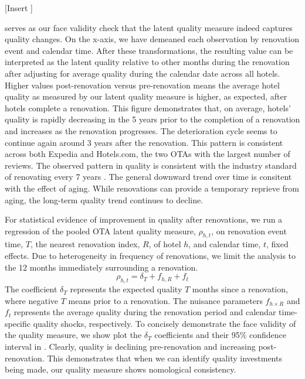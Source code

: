 \documentclass[mksc,blindrev]{informs3} %
\begin{document}
[Insert ]

 serves as our face validity check that the latent quality measure indeed captures quality changes. On the x-axis, we have demeaned each observation by renovation event and calendar time. After these transformations, the resulting value can be interpreted as the latent quality relative to other months during the renovation after adjusting for average quality during the calendar date across all hotels. Higher values post-renovation versus pre-renovation means the average hotel quality as measured by our latent quality measure is higher, as expected, after hotels complete a renovation. This figure demonstrates that, on average, hotels' quality is rapidly decreasing in the 5 years prior to the completion of a renovation and increases as the renovation progresses. The deterioration cycle seems to continue again around 3 years after the renovation. This pattern is consistent across both Expedia and Hotels.com, the two OTAs with the largest number of reviews. The observed pattern in quality is consistent with the industry standard of renovating every 7 years \citep{renofreq2008}. The general downward trend over time is consitent with the effect of aging. While renovations can provide a temporary reprieve from aging, the long-term quality trend continues to decline. 

For statistical evidence of improvement in quality after renovations, we run a regression of the pooled OTA latent quality measure, $\rho_{h,t}$, on renovation event time, $T$, the nearest renovation index, $R$, of hotel $h$, and calendar time, $t$, fixed effects. Due to heterogeneity in frequency of renovations, we limit the analysis to the 12 months immediately surrounding a renovation.
\begin{equation}\label{eq:renoreg}
\rho_{h,t}=\delta_{T}+f_{h,R}+f_{t}
\end{equation}
The coefficient $\delta_T$ represents the expected quality $T$ months since a renovation, where negative $T$ means prior to a renovation. The nuisance parameters $f_{h\times R}$ and $f_t$ represents the average quality during the renovation period and calendar time-specific quality shocks, respectively. To concisely demonstrate the face validity of the quality measure, we show plot the $\delta_T$ coefficients and their 95\% confidence interval in . Clearly, quality is declining pre-renovation and increasing post-renovation. This demonstrates that when we can identify quality investments being made, our quality measure shows nomological consistency. 
\end{document}
